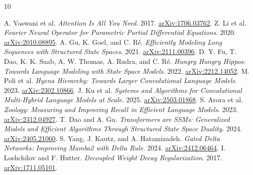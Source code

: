 \begin{thebibliography}{10}\small\raggedright
{} A. Vaswani et al. \emph{Attention Is All You Need}. 2017. \href{https://arxiv.org/abs/1706.03762}{arXiv:1706.03762}.
 Z. Li et al. \emph{Fourier Neural Operator for Parametric Partial Differential Equations}. 2020. \href{https://arxiv.org/abs/2010.08895}{arXiv:2010.08895}.
 A. Gu, K. Goel, and C. R\'e. \emph{Efficiently Modeling Long Sequences with Structured State Spaces}. 2021. \href{https://arxiv.org/abs/2111.00396}{arXiv:2111.00396}.
 D. Y. Fu, T. Dao, K. K. Saab, A. W. Thomas, A. Rudra, and C. R\'e. \emph{Hungry Hungry Hippos: Towards Language Modeling with State Space Models}. 2022. \href{https://arxiv.org/abs/2212.14052}{arXiv:2212.14052}.
 M. Poli et al. \emph{Hyena Hierarchy: Towards Larger Convolutional Language Models}. 2023. \href{https://arxiv.org/abs/2302.10866}{arXiv:2302.10866}.
 J. Ku et al. \emph{Systems and Algorithms for Convolutional Multi-Hybrid Language Models at Scale}. 2025. \href{https://arxiv.org/abs/2503.01868}{arXiv:2503.01868}.
 S. Arora et al. \emph{Zoology: Measuring and Improving Recall in Efficient Language Models}. 2023. \href{https://arxiv.org/abs/2312.04927}{arXiv:2312.04927}.
 T. Dao and A. Gu. \emph{Transformers are SSMs: Generalized Models and Efficient Algorithms Through Structured State Space Duality}. 2024. \href{https://arxiv.org/abs/2405.21060}{arXiv:2405.21060}.
 S. Yang, J. Kautz, and A. Hatamizadeh. \emph{Gated Delta Networks: Improving Mamba2 with Delta Rule}. 2024. \href{https://arxiv.org/abs/2412.06464}{arXiv:2412.06464}.
 I. Loshchilov and F. Hutter. \emph{Decoupled Weight Decay Regularization}. 2017. \href{https://arxiv.org/abs/1711.05101}{arXiv:1711.05101}.
\end{thebibliography}
